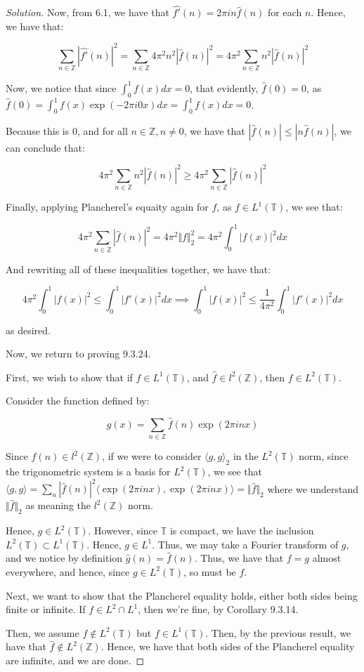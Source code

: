 \documentclass[10pt]{article}
\begin{document}
\begin{proof}[Solution]
Now, from 6.1, we have that $\hat{f'}(n) =  2\pi i n \hat{f}(n)$ for each $n$. Hence, we have that:

$$  \sum_{n \in \mathbb{Z}} | \hat{f'}(n)|^2 =  \sum_{n \in \mathbb{Z}} 4 \pi^2 n^2| \hat{f}(n)|^2 = 4 \pi^2 \sum_{n \in \mathbb{Z}} n^2| \hat{f}(n)|^2$$

Now, we notice that since $\int_0^1 f(x) dx = 0$, that evidently, $\hat{f}(0) = 0$, as $\hat{f}(0) = \int_0^1 f(x) \exp(-2\pi i 0 x) dx = \int_0^1 f(x) dx = 0$.

Because this is 0, and for all $n \in \mathbb{Z}, n \not = 0$, we have that $|\hat{f}(n)| \leq | n \hat{f}(n)|$, we can conclude that:

$$  4 \pi^2 \sum_{n \in \mathbb{Z}} n^2| \hat{f}(n)|^2 \geq 4 \pi^2 \sum_{n \in \mathbb{Z}} | \hat{f}(n) |^2 $$

Finally, applying Plancherel's equaity again for $f$, as $f \in L^1(\mathbb{T})$, we see that:

$$ 4 \pi^2 \sum_{n \in \mathbb{Z}} | \hat{f}(n) |^2  = 4 \pi^2 \Vert f \Vert_2^2 = 4 \pi^2 \int_0^1 |f(x)|^2 dx $$

And rewriting all of these inequalities together, we have that:

$$ 4\pi^2 \int_0^1 |f(x)|^2 \leq \int_0^1 |f'(x)|^2 dx \implies \int_0^1 |f(x)|^2 \leq \frac{1}{4\pi^2} \int_0^1 |f'(x)|^2 dx$$

as desired.

Now, we return to proving 9.3.24.

First, we wish to show that if $f \in L^1(\mathbb{T})$, and $\hat{f} \in l^2(\mathbb{Z})$, then $f \in L^2(\mathbb{T})$.

Consider the function defined by:

$$ g(x) = \sum_{n \in \mathbb{Z}} \hat{f}(n) \exp(2 \pi i n x) $$

Since $\hat{f}(n) \in l^2(\mathbb{Z})$, if we were to consider $\langle g, g \rangle_2$ in the $L^2(\mathbb{T})$ norm, since the trigonometric system is a basis for $L^2(\mathbb{T})$, we see that $\langle g, g \rangle = \sum_n |\hat{f}(n)|^2 \langle \exp(2 \pi i n x), \exp(2\pi i n x) \rangle = \Vert \hat{f} \Vert_2$ where we understand $\Vert \hat{f} \Vert_2$ as meaning the $l^2(\mathbb{Z})$ norm.

Hence, $g \in L^2(\mathbb{T})$. However, since $\mathbb{T}$ is compact, we have the inclusion $L^2(\mathbb{T}) \subset L^1(\mathbb{T})$. Hence, $g \in L^1$. Thus, we may take a Fourier transform of $g$, and we notice by definition $\hat{g}(n) = \hat{f}(n)$. Thus, we have that $f = g$ almost everywhere, and hence, since $g \in L^2(\mathbb{T})$, so must be $f$.

Next, we want to show that the Plancherel equality holds, either both sides being finite or infinite. If $f \in L^2 \cap L^1$, then we're fine, by Corollary 9.3.14.

Then, we assume $f \not \in L^2(\mathbb{T})$ but $f \in L^1(\mathbb{T})$. Then, by the previous result, we have that $\hat{f} \not \in L^2(\mathbb{Z})$. Hence, we have that both sides of the Plancherel equality are infinite, and we are done.




\end{proof}
\end{document}
